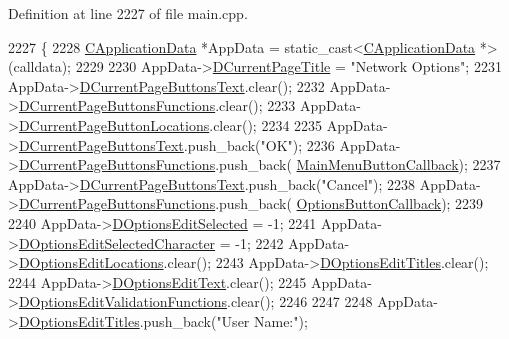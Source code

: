 Definition at line 2227 of file main.\+cpp.


\begin{DoxyCode}
2227                                                                  \{
2228     \hyperlink{classCApplicationData}{CApplicationData} *AppData = \textcolor{keyword}{static\_cast<}\hyperlink{classCApplicationData}{CApplicationData} *\textcolor{keyword}{>}(calldata);
2229 
2230     AppData->\hyperlink{classCApplicationData_a49ce7f0b5891f0f2c29b73aad636b761}{DCurrentPageTitle} = \textcolor{stringliteral}{"Network Options"};
2231     AppData->\hyperlink{classCApplicationData_af04b7f5f8ba4e5c99c0a3530055fc15d}{DCurrentPageButtonsText}.clear();
2232     AppData->\hyperlink{classCApplicationData_ad3079e5563a19d21c1e4ceff2a188382}{DCurrentPageButtonsFunctions}.clear();
2233     AppData->\hyperlink{classCApplicationData_a3615df8e23cea3ce17f11cf61340a7b4}{DCurrentPageButtonLocations}.clear();
2234     
2235     AppData->\hyperlink{classCApplicationData_af04b7f5f8ba4e5c99c0a3530055fc15d}{DCurrentPageButtonsText}.push\_back(\textcolor{stringliteral}{"OK"});
2236     AppData->\hyperlink{classCApplicationData_ad3079e5563a19d21c1e4ceff2a188382}{DCurrentPageButtonsFunctions}.push\_back(
      \hyperlink{classCApplicationData_a4410839118b5b74dab798ad7be6f703b}{MainMenuButtonCallback});
2237     AppData->\hyperlink{classCApplicationData_af04b7f5f8ba4e5c99c0a3530055fc15d}{DCurrentPageButtonsText}.push\_back(\textcolor{stringliteral}{"Cancel"});
2238     AppData->\hyperlink{classCApplicationData_ad3079e5563a19d21c1e4ceff2a188382}{DCurrentPageButtonsFunctions}.push\_back(
      \hyperlink{classCApplicationData_a3647cf78eb59689b901d4204c81555b4}{OptionsButtonCallback});
2239     
2240     AppData->\hyperlink{classCApplicationData_aee4aa5eb5b89b86eb2648d0f9c7358f9}{DOptionsEditSelected} = -1;
2241     AppData->\hyperlink{classCApplicationData_a921d69021fc61e51d12d8a26a5ac1a89}{DOptionsEditSelectedCharacter} = -1;
2242     AppData->\hyperlink{classCApplicationData_ab4e6804c6e50cca45ab3c3071588da34}{DOptionsEditLocations}.clear();
2243     AppData->\hyperlink{classCApplicationData_a7a322ef6b8c1db3e995c6b493230fd05}{DOptionsEditTitles}.clear();
2244     AppData->\hyperlink{classCApplicationData_a7044dc34cbd9d6776e8ef79eb12b5ce4}{DOptionsEditText}.clear();
2245     AppData->\hyperlink{classCApplicationData_ab76fa444142de66fdb058f390e01112c}{DOptionsEditValidationFunctions}.clear();
2246     
2247     
2248     AppData->\hyperlink{classCApplicationData_a7a322ef6b8c1db3e995c6b493230fd05}{DOptionsEditTitles}.push\_back(\textcolor{stringliteral}{"User Name:"});

\end{DoxyCode}
